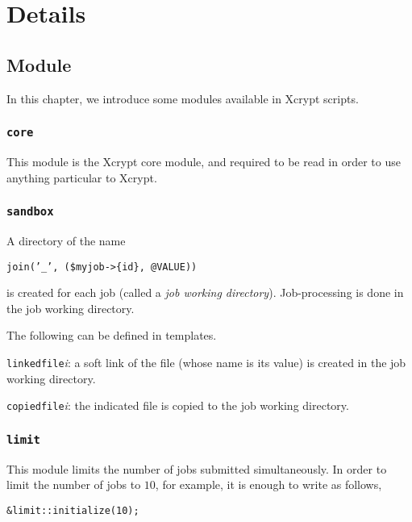 \documentclass[a4paper,10pt]{report}
\begin{document}
\part{Details}

\chapter{Module}\label{chapmodule}

In this chapter, we introduce some modules available in Xcrypt scripts.

\section{\texttt{core}}

This module is the Xcrypt core module, and required to be read in
order to use anything particular to Xcrypt.

\section{\texttt{sandbox}}

A directory of the name
\begin{center}
\texttt{join('\_', (\$myjob->\{id\}, @VALUE))}
\end{center}
is created for each job (called a \textit{job working directory}).
Job-processing is done in the job working directory.

The following can be defined in templates.

\texttt{linkedfile}\textit{i}: a soft link of the file (whose name is
its value) is created in the job working directory.

\texttt{copiedfile}\textit{i}: the indicated file is copied to the job
working directory.

\section{\texttt{limit}}

This module limits the number of jobs submitted simultaneously.
In order to limit the number of jobs to $10$, for example, it is enough to
write as follows,
\begin{boxnote}
\begin{verbatim}
&limit::initialize(10);
\end{verbatim}
\end{boxnote}
\end{document}
